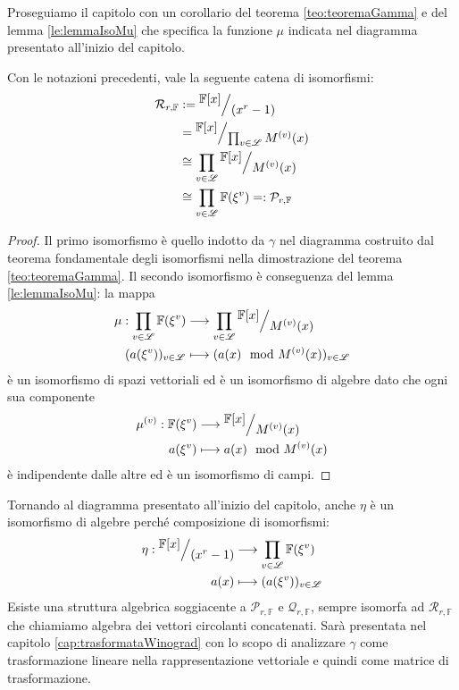 Proseguiamo il capitolo con un corollario del teorema \ref{teo:teoremaGamma} e del lemma \ref{le:lemmaIsoMu} che specifica la funzione $\mu$ indicata nel diagramma presentato all'inizio del capitolo.
\begin{corollario}
  Con le notazioni precedenti, vale la seguente catena di isomorfismi:
  \begin{align*}
      \mathcal{R}_{r, \mathbb{F}} & := \quotient{\mathbb{F} \lbrack x \rbrack  }{ (x^{r} - 1)} \\
            & = \quotient{\mathbb{F} \lbrack x \rbrack  }{ \prod_{v\in \mathscr{L}} M^{(v)}(x)} \\
            &\cong \prod_{v\in \mathscr{L}} \quotient{\mathbb{F} \lbrack x \rbrack  }{M^{(v)}(x)}  \\
            &\cong \prod_{v\in \mathscr{L}} \mathbb{F}(\xi^{v}) =: \mathcal{P}_{r,\mathbb{F}}
   \end{align*}
\end{corollario}
\begin{proof}
   Il primo isomorfismo è quello indotto da $\gamma$ nel diagramma costruito dal teorema fondamentale degli isomorfismi nella dimostrazione del teorema \ref{teo:teoremaGamma}. Il secondo isomorfismo è conseguenza del lemma \ref{le:lemmaIsoMu}: la mappa
   \begin{align*}
   \mu : \prod_{v\in \mathscr{L}} \mathbb{F}(\xi^{v})
	    & \longrightarrow
	    \prod_{v\in \mathscr{L}} \quotient{\mathbb{F} \lbrack x \rbrack  }{M^{(v)}(x)}   \\
	    (a(\xi^{v}))_{v \in \mathscr{L}} &\longmapsto  ( a(x)\mod{M^{(v)}(x)})_{v \in \mathscr{L}}
   \end{align*}
   è un isomorfismo di spazi vettoriali ed è un isomorfismo di algebre dato che ogni sua componente
   \begin{align*}
   \mu^{(v)} :  \mathbb{F}(\xi^{v})
	    & \longrightarrow
	    \quotient{\mathbb{F} \lbrack x \rbrack  }{M^{(v)}(x)}   \\
	    a(\xi^{v}) &\longmapsto  a(x)\mod{M^{(v)}(x)}
   \end{align*}
   è indipendente dalle altre ed è un isomorfismo di campi.
\end{proof}

Tornando al diagramma presentato all'inizio del capitolo, anche $\eta$ è un isomorfismo di algebre perché composizione di isomorfismi:
\begin{align*}
\eta : \quotient{\mathbb{F} \lbrack x \rbrack  }{(x^r - 1)}
	& \longrightarrow
	 \prod_{v\in \mathscr{L}} \mathbb{F}(\xi^{v})   \\
	a(x) &\longmapsto  (a(\xi^{v}))_{v\in \mathscr{L}}
\end{align*}
Esiste una struttura algebrica soggiacente a $\mathcal{P}_{r,\mathbb{F}}$ e $\mathcal{Q}_{r,\mathbb{F}}$, sempre isomorfa ad $\mathcal{R}_{r,\mathbb{F}}$ che chiamiamo algebra dei vettori circolanti concatenati. Sarà presentata nel capitolo \ref{cap:trasformataWinograd} con lo scopo di analizzare $\gamma$ come trasformazione lineare nella rappresentazione vettoriale e quindi come matrice di trasformazione.



